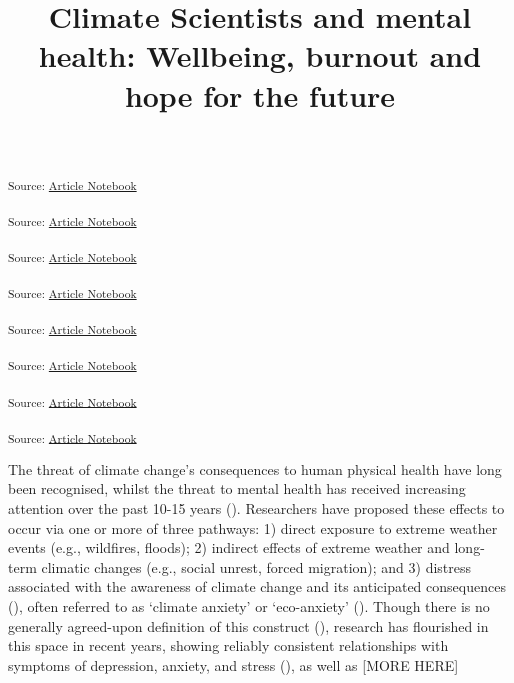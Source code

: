 \documentclass[
  man,
  longtable,
  nolmodern,
  notxfonts,
  notimes,
  colorlinks=true,linkcolor=blue,citecolor=blue,urlcolor=blue]{apa7}
\title{Climate Scientists and mental health: Wellbeing, burnout and hope
for the future}
\begin{document}
\maketitle




\setlength\LTleft{0pt}




\textsubscript{Source:
\href{https://deborahapthorp.github.io/Amy_ClimateScientists/index.qmd.html}{Article
Notebook}}

\textsubscript{Source:
\href{https://deborahapthorp.github.io/Amy_ClimateScientists/index.qmd.html}{Article
Notebook}}

\textsubscript{Source:
\href{https://deborahapthorp.github.io/Amy_ClimateScientists/index.qmd.html}{Article
Notebook}}

\textsubscript{Source:
\href{https://deborahapthorp.github.io/Amy_ClimateScientists/index.qmd.html}{Article
Notebook}}

\textsubscript{Source:
\href{https://deborahapthorp.github.io/Amy_ClimateScientists/index.qmd.html}{Article
Notebook}}

\textsubscript{Source:
\href{https://deborahapthorp.github.io/Amy_ClimateScientists/index.qmd.html}{Article
Notebook}}

\textsubscript{Source:
\href{https://deborahapthorp.github.io/Amy_ClimateScientists/index.qmd.html}{Article
Notebook}}

\textsubscript{Source:
\href{https://deborahapthorp.github.io/Amy_ClimateScientists/index.qmd.html}{Article
Notebook}}

The threat of climate change's consequences to human physical health
have long been recognised, whilst the threat to mental health has
received increasing attention over the past 10-15 years
().
Researchers have proposed these effects to occur via one or more of
three pathways: 1) direct exposure to extreme weather events (e.g.,
wildfires, floods); 2) indirect effects of extreme weather and long-term
climatic changes (e.g., social unrest, forced migration); and 3)
distress associated with the awareness of climate change and its
anticipated consequences (), often referred to as `climate anxiety' or `eco-anxiety'
(). Though there is no
generally agreed-upon definition of this construct
(), research has
flourished in this space in recent years, showing reliably consistent
relationships with symptoms of depression, anxiety, and stress
(), as well as
{[}MORE HERE{]}
\end{document}

